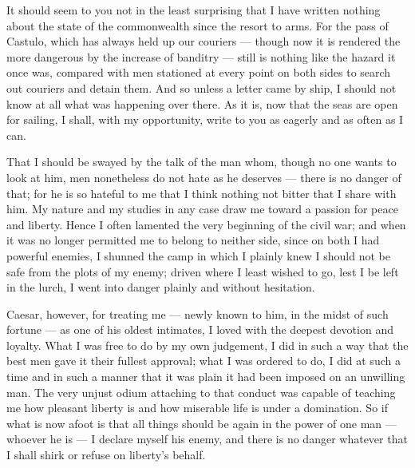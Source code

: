 

 It should seem to you not in the least surprising that I have written nothing about the state of the commonwealth since the resort to arms. For the pass of Castulo, which has always held up our couriers --- though now it is rendered the more dangerous by the increase of banditry --- still is nothing like the hazard it once was, compared with men stationed at every point on both sides to search out couriers and detain them. And so unless a letter came by ship, I should not know at all what was happening over there. As it is, now that the seas are open for sailing, I shall, with my opportunity, write to you as eagerly and as often as I can.

 That I should be swayed by the talk of the man whom, though no one wants to look at him, men nonetheless do not hate as he deserves --- there is no danger of that; for he is so hateful to me that I think nothing not bitter that I share with him. My nature and my studies in any case draw me toward a passion for peace and liberty. Hence I often lamented the very beginning of the civil war; and when it was no longer permitted me to belong to neither side, since on both I had powerful enemies, I shunned the camp in which I plainly knew I should not be safe from the plots of my enemy; driven where I least wished to go, lest I be left in the lurch, I went into danger plainly and without hesitation.

 Caesar, however, for treating me --- newly known to him, in the midst of such fortune --- as one of his oldest intimates, I loved with the deepest devotion and loyalty. What I was free to do by my own judgement, I did in such a way that the best men gave it their fullest approval; what I was ordered to do, I did at such a time and in such a manner that it was plain it had been imposed on an unwilling man. The very unjust odium attaching to that conduct was capable of teaching me how pleasant liberty is and how miserable life is under a domination. So if what is now afoot is that all things should be again in the power of one man --- whoever he is --- I declare myself his enemy, and there is no danger whatever that I shall shirk or refuse on liberty's behalf.

